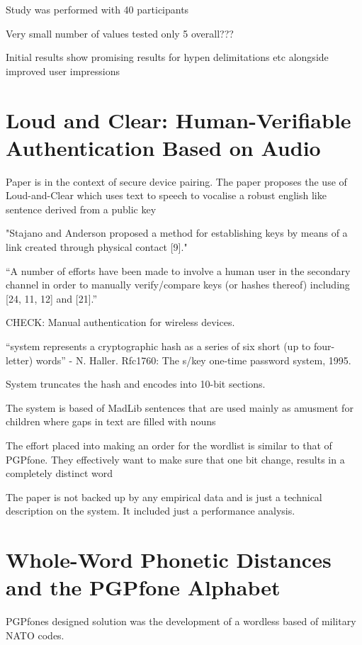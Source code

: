 Study was performed with 40 participants

Very small number of values tested only 5 overall???

Initial results show promising results for hypen delimitations etc alongside improved user impressions


\newpage

\section{Loud and Clear: Human-Verifiable Authentication Based on Audio}

Paper is in the context of secure device pairing. The paper proposes the use of Loud-and-Clear which uses text to speech to vocalise a robust english like sentence derived from a public key


"Stajano and Anderson proposed a method
for establishing keys by means of a link created through physical contact [9]."

``A number of efforts have been made to involve a human user in the secondary channel in order to manually verify/compare
keys (or hashes thereof) including [24, 11, 12] and [21].''

CHECK: Manual authentication for wireless devices.

``system represents a cryptographic hash as a series of six short (up to four-
letter) words'' - N. Haller. Rfc1760: The s/key one-time password system, 1995.

System truncates the hash and encodes into 10-bit sections.

The system is based of MadLib sentences that are used mainly as amusment for children where gaps in text are filled with nouns

The effort placed into making an order for the wordlist is similar to that of PGPfone. They effectively want to make sure that one bit change, results in a completely distinct word

The paper is not backed up by any empirical data and is just a technical description on the system. It included just a performance analysis.

\newpage

\section{Whole-Word Phonetic Distances and the PGPfone Alphabet}

PGPfones designed solution was the development of a wordless based of military NATO codes.

